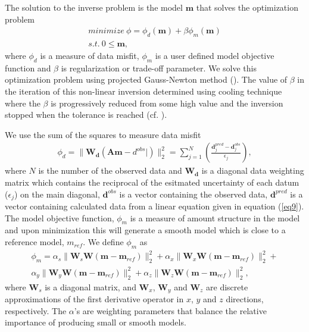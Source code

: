 \documentclass[a4paper, 11pt]{article}
\begin{document}
The solution to the inverse problem is the model $\mathbf{m}$ that solves the optimization problem
\begin{eqnarray}
  minimize \ \phi =  \phi_d(\mathbf{m}) + \beta\phi_m(\mathbf{m})\nonumber \\
  s.t. \ 0 \le \mathbf{m},
  \label{eq10}
\end{eqnarray}
where $\phi_d$ is a measure of data misfit, $\phi_m$ is a user defined model objective function and $\beta$ is regularization or trade-off parameter. We solve this optimization problem using projected Gauss-Newton method (\cite{Kelley}). 
The value of $\beta$ in the iteration of this non-linear inversion determined using cooling technique where the $\beta$ is progressively reduced from some high value and the inversion stopped when the tolerance is reached (cf. \cite{Kang2014}). 

We use the sum of the squares to measure data misfit
\begin{eqnarray}
  \phi_d = \| \mathbf{W_d}(\mathbf{A}\mathbf{m}-d^{obs}|)\|^2_2 =
  \sum^N_{j=1}(\frac{\mathbf{d}^{pred}_j-\mathbf{d}^{obs}_j}{\epsilon_j}),
  \label{eq11}
\end{eqnarray}
where $N$ is the number of the observed data and $\mathbf{W_d}$ is a diagonal data weighting matrix which contains the reciprocal of the esitmated uncertainty of each datum ($\epsilon_j$) on the main diagonal,  $\mathbf{d}^{obs}$ is a vector containing the observed data, $\mathbf{d}^{pred}$ is a vector containing calculated data from a linear equation given in equation (\ref{eq9}).
The model objective function, $\phi_m$ is a measure of amount structure in the model and upon minimization this will generate a smooth model which is close to a reference model, $m_{ref}$. 
We define $\phi_m$ as
\begin{eqnarray}
  \phi_m = \alpha_s\| \mathbf{W}_s\mathbf{W}(\mathbf{m}-\mathbf{m}_{ref})\|^2_2+
       \alpha_x\| \mathbf{W}_x\mathbf{W}(\mathbf{m}-\mathbf{m}_{ref})\|^2_2+ \nonumber \\
       \alpha_y\| \mathbf{W}_y\mathbf{W}(\mathbf{m}-\mathbf{m}_{ref})\|^2_2+
       \alpha_z\| \mathbf{W}_z\mathbf{W}(\mathbf{m}-\mathbf{m}_{ref})\|^2_2,
  \label{eq12}
\end{eqnarray}
where $\mathbf{W}_s$ is a diagonal matrix, and $\mathbf{W}_x$, $\mathbf{W}_y$ and $\mathbf{W}_z$ are discrete approximations of the first derivative operator in $x$, $y$ and $z$ directions, respectively.  
The $\alpha$'s are weighting parameters that balance the relative importance of producing small or smooth models.
\end{document}

